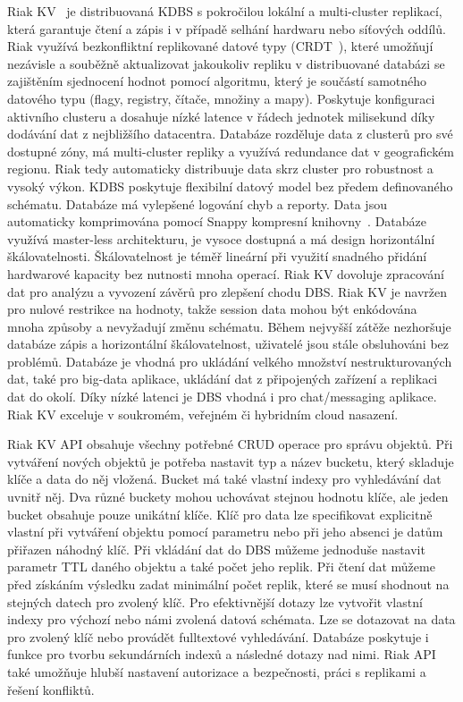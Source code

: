 \documentclass[czech,master,dept460,male,csharp,cpdeclaration]{diploma}
\begin{document}
	Riak KV~\cite{riak} je distribuovaná KDBS s pokročilou lokální a multi-cluster replikací, která garantuje čtení a zápis i v případě selhání hardwaru nebo síťových oddílů. Riak využívá bezkonfliktní replikované datové typy (CRDT~\cite{crdt}), které umožňují nezávisle a souběžně aktualizovat jakoukoliv repliku v distribuované databázi se zajištěním sjednocení hodnot pomocí algoritmu, který je součástí samotného datového typu (flagy, registry, čítače, množiny a mapy). Poskytuje konfiguraci aktivního clusteru a dosahuje nízké latence v řádech jednotek milisekund díky dodávání dat z nejbližšího datacentra. Databáze rozděluje data z clusterů pro své dostupné zóny, má multi-cluster repliky a využívá redundance dat v geografickém regionu. Riak tedy automaticky distribuuje data skrz cluster pro robustnost a vysoký výkon. KDBS poskytuje flexibilní datový model bez předem definovaného schématu. Databáze má vylepšené logování chyb a reporty. Data jsou automaticky komprimována pomocí Snappy kompresní knihovny~\cite{snappy}. Databáze využívá master-less architekturu, je vysoce dostupná a má design horizontální škálovatelnosti. Škálovatelnost je téměř lineární při využití snadného přidání hardwarové kapacity bez nutnosti mnoha operací. Riak KV dovoluje zpracování dat pro analýzu a vyvození závěrů pro zlepšení chodu DBS. Riak KV je navržen pro nulové restrikce na hodnoty, takže session data mohou být enkódována mnoha způsoby a nevyžadují změnu schématu. Během nejvyšší zátěže nezhoršuje databáze zápis a horizontální škálovatelnost, uživatelé jsou stále obsluhováni bez problémů. Databáze je vhodná pro ukládání velkého množství nestrukturovaných dat, také pro big-data aplikace, ukládání dat z připojených zařízení a replikaci dat do okolí. Díky nízké latenci je DBS vhodná i pro chat/messaging aplikace. Riak KV exceluje v soukromém, veřejném či hybridním cloud nasazení.
	
	Riak KV API obsahuje všechny potřebné CRUD operace pro správu objektů. Při vytváření nových objektů je potřeba nastavit typ a název bucketu, který skladuje klíče a data do něj vložená. Bucket má také vlastní indexy pro vyhledávání dat uvnitř něj. Dva různé buckety mohou uchovávat stejnou hodnotu klíče, ale jeden bucket obsahuje pouze unikátní klíče. Klíč pro data lze specifikovat explicitně vlastní při vytváření objektu pomocí parametru nebo při jeho absenci je datům přiřazen náhodný klíč. Při vkládání dat do DBS můžeme jednoduše nastavit parametr TTL daného objektu a také počet jeho replik. Při čtení dat můžeme před získáním výsledku zadat minimální počet replik, které se musí shodnout na stejných datech pro zvolený klíč. Pro efektivnější dotazy lze vytvořit vlastní indexy pro výchozí nebo námi zvolená datová schémata. Lze se dotazovat na data pro zvolený klíč nebo provádět fulltextové vyhledávání. Databáze poskytuje i funkce pro tvorbu sekundárních indexů a následné dotazy nad nimi. Riak API také umožňuje hlubší nastavení autorizace a bezpečnosti, práci s replikami a řešení konfliktů.
	
\end{document}

